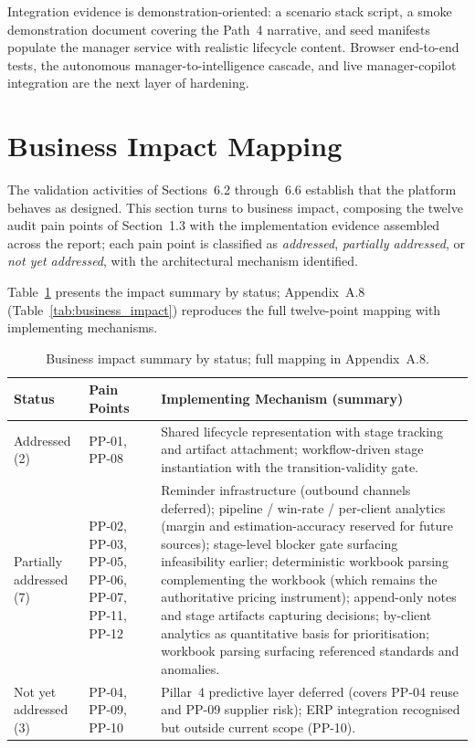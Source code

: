 Integration evidence is demonstration-oriented: a scenario stack script, a smoke demonstration document covering the Path~4 narrative, and seed manifests populate the manager service with realistic lifecycle content. Browser end-to-end tests, the autonomous manager-to-intelligence cascade, and live manager-copilot integration are the next layer of hardening.

\section{Business Impact Mapping}
The validation activities of Sections~6.2 through~6.6 establish that the platform behaves as designed. This section turns to business impact, composing the twelve audit pain points of Section~1.3 with the implementation evidence assembled across the report; each pain point is classified as \textit{addressed}, \textit{partially addressed}, or \textit{not yet addressed}, with the architectural mechanism identified.

Table~\ref{tab:business_impact_summary} presents the impact summary by status; Appendix~A.8 (Table~\ref{tab:business_impact}) reproduces the full twelve-point mapping with implementing mechanisms.

\begin{table}[H]
\centering
\renewcommand{\arraystretch}{1.4}
\footnotesize
\begin{tabularx}{\textwidth}{|p{2.5cm}|p{2.2cm}|>{\RaggedRight\arraybackslash}X|}
\hline
\rowcolor{lightgray}
\textbf{Status} & \textbf{Pain Points} & \textbf{Implementing Mechanism (summary)} \\ \hline
Addressed (2) & PP-01, PP-08 & Shared lifecycle representation with stage tracking and artifact attachment; workflow-driven stage instantiation with the transition-validity gate. \\ \hline
Partially addressed (7) & PP-02, PP-03, PP-05, PP-06, PP-07, PP-11, PP-12 & Reminder infrastructure (outbound channels deferred); pipeline / win-rate / per-client analytics (margin and estimation-accuracy reserved for future sources); stage-level blocker gate surfacing infeasibility earlier; deterministic workbook parsing complementing the workbook (which remains the authoritative pricing instrument); append-only notes and stage artifacts capturing decisions; by-client analytics as quantitative basis for prioritisation; workbook parsing surfacing referenced standards and anomalies. \\ \hline
Not yet addressed (3) & PP-04, PP-09, PP-10 & Pillar~4 predictive layer deferred (covers PP-04 reuse and PP-09 supplier risk); ERP integration recognised but outside current scope (PP-10). \\ \hline
\end{tabularx}
\caption{Business impact summary by status; full mapping in Appendix~A.8.}
\label{tab:business_impact_summary}
\end{table}

